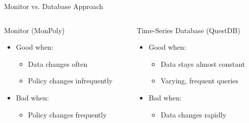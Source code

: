 \begin{frame}{Monitor vs. Database Approach}
    \begin{columns}
        \begin{column}{0.5\textwidth}
            {\Large Monitor (MonPoly)}
            \begin{itemize}
                \item Good when: 
                    \begin{itemize}
                        \item Data changes often
                        \item Policy changes infrequently
                    \end{itemize}
                \item Bad when:
                    \begin{itemize}
                        \item Policy changes frequently
                    \end{itemize}
            \end{itemize}

        \end{column}
        \begin{column}{0.5\textwidth}
            {\Large Time-Series Database (QuestDB)}
            \begin{itemize}
                \item Good when:
                    \begin{itemize}
                        \item Data stays almost constant
                        \item Varying, frequent queries
                    \end{itemize}

                \item Bad when:
                    \begin{itemize}
                        \item Data changes rapidly
                    \end{itemize}
            \end{itemize}


        \end{column}
    \end{columns}
    
\end{frame}


